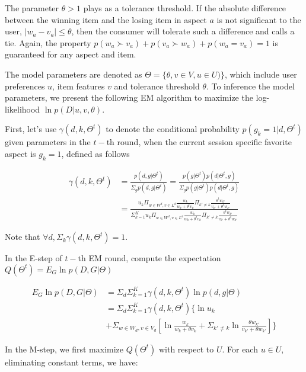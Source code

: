 \documentclass[sigconf]{acmart}
\begin{document}
The parameter $\theta>1$ plays as a tolerance threshold. If the absolute difference between the winning item and the losing item in aspect $a$ is not significant to the user, $|w_a-v_a|\leq \theta$, then the consumer will tolerate such a difference and calls a tie. Again, the property $p(w_a \succ v_a) + p(v_a \succ w_a) + p( w_a = v_a) =1$ is guaranteed for any aspect and item.
 



The model parameters are denoted as $\Theta=\{\theta,v\in V, u\in U)\}$, which include user preferences $u$, item features $v$ and tolerance threshold $\theta$. To inference the model parameters, we present the following EM algorithm to maximize the log-likelihood $\ln p(D|u,v,\theta)$. 

First, let's use $\gamma(d,k,\Theta^t)$ to denote the conditional probability $p(g_k=1|d,\Theta^t)$ given parameters in the $t-$th round, when the current session specific favorite aspect is $g_k=1$, defined as follows

\begin{align}\label{equ:conditional}
\gamma(d,k,\Theta^t) &=\frac{p(d,g|\Theta^t)}{\Sigma_g p(d,g|\Theta^t)} = \frac{p(g|\Theta^t)p(d|\Theta^t,g)}{\Sigma_g p(g|\Theta^t)p(d|\Theta^t,g)}\\\nonumber
&=\frac{u_k \Pi_{w \in W^d, v\in L^d} \frac{w_k}{w_k+\theta^t v_k}\Pi_{k'\neq k}\frac{\theta^t w_{k'}}{v_{k'}+\theta^t w_{k'}}}{\Sigma_{k=1}^K u_k \Pi_{w \in W^d, v\in L^d} \frac{w_k}{w_k+\theta^t v_k}\Pi_{k'\neq k}\frac{\theta^t w_{k'}}{v_{k'}+\theta^t w_{k'}}}
\end{align}

Note that $\forall d, \Sigma_k \gamma(d,k,\Theta^t)=1$.

In the E-step of $t-$th  EM round, compute the expectation $Q(\Theta^t)=E_{G} \ln p(D,G|\Theta) $

\begin{align}\label{equ:estep}
E_{G} \ln p(D,G|\Theta) & = \Sigma_d \Sigma_{k=1}^K \gamma(d,k,\Theta^t) \ln p(d,g|\Theta)\\\nonumber
& = \Sigma_d \Sigma_{k=1}^K \gamma(d,k,\Theta^t) \{ \ln u_k \\ \nonumber
&+ \Sigma_{w\in W_d, v\in V_d} [\ln \frac{w_k}{w_k +\theta v_k} +\Sigma_{k'\neq k} \ln \frac{\theta w_{k'}}{v_{k'}+\theta w_{k'}}]\}
\end{align}

In the M-step, we first maximize $Q(\Theta^t)$ with respect to $U$. For each $u \in U$, eliminating constant terms, we have:
\end{document}
